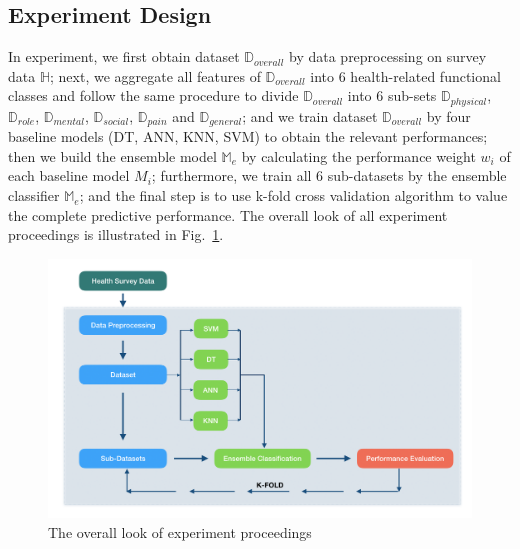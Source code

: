 \documentclass[12pt]{article}
\begin{document}
\subsection{Experiment Design}
In experiment, we first obtain dataset $\mathbb{D}_{overall}$ by data preprocessing on survey data $\mathbb{H}$; next, we aggregate all features of $\mathbb{D}_{overall}$ into 6 health-related functional classes and follow the same procedure to divide $\mathbb{D}_{overall}$ into 6 sub-sets $\mathbb{D}_{physical}$, $\mathbb{D}_{role}$, $\mathbb{D}_{mental}$, $\mathbb{D}_{social}$, $\mathbb{D}_{pain}$ and $\mathbb{D}_{general}$; and we train dataset $\mathbb{D}_{overall}$ by four baseline models (DT, ANN, KNN, SVM) to obtain the relevant performances; then we build the ensemble model $\mathbb{M}_{e}$ by calculating the performance weight $w_{i}$ of each baseline model $M_{i} $; furthermore, we train all 6 sub-datasets by the ensemble classifier $\mathbb{M}_{e}$; and the final step is to use k-fold cross validation algorithm to value the complete predictive performance. The overall look of all experiment proceedings is illustrated in Fig.~\ref{fig4}. 
\begin{figure}[h]
\includegraphics[width=1\textwidth]{experiment.png}
\caption{The overall look of experiment proceedings} \label{fig4}
\end{figure}
\\
\\
\end{document}
